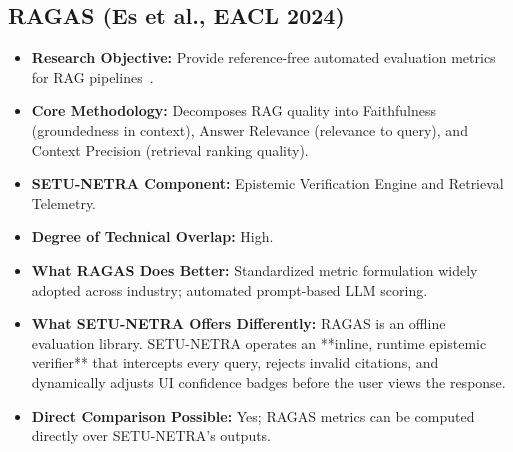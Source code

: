 \documentclass[11pt,a4paper]{article}
\begin{document}
\subsection{RAGAS (Es et al., EACL 2024)}
\begin{itemize}[leftmargin=*]
    \item \textbf{Research Objective:} Provide reference-free automated evaluation metrics for RAG pipelines~\cite{Es2024Ragas}.
    \item \textbf{Core Methodology:} Decomposes RAG quality into Faithfulness (groundedness in context), Answer Relevance (relevance to query), and Context Precision (retrieval ranking quality).
    \item \textbf{SETU-NETRA Component:} Epistemic Verification Engine and Retrieval Telemetry.
    \item \textbf{Degree of Technical Overlap:} High.
    \item \textbf{What RAGAS Does Better:} Standardized metric formulation widely adopted across industry; automated prompt-based LLM scoring.
    \item \textbf{What SETU-NETRA Offers Differently:} RAGAS is an offline evaluation library. SETU-NETRA operates an **inline, runtime epistemic verifier** that intercepts every query, rejects invalid citations, and dynamically adjusts UI confidence badges before the user views the response.
    \item \textbf{Direct Comparison Possible:} Yes; RAGAS metrics can be computed directly over SETU-NETRA's outputs.
\end{itemize}

\end{document}
